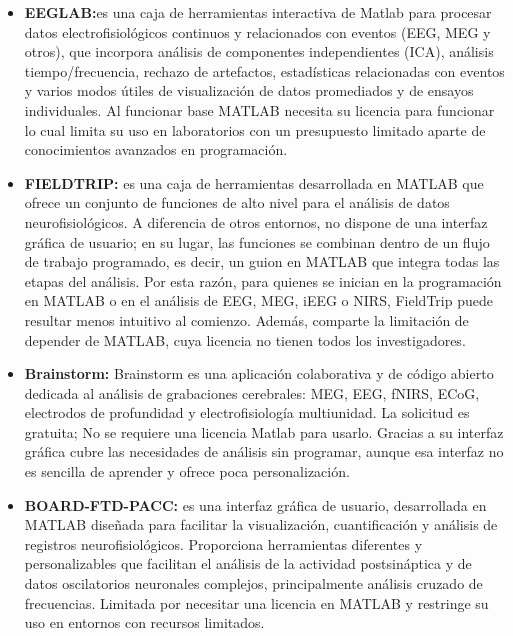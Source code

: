 \documentclass[12pt,letterpaper]{article}
\begin{document}
\begin{itemize}
    \item \textbf{EEGLAB:}es una caja de herramientas interactiva de Matlab para procesar datos electrofisiológicos continuos y relacionados con eventos (EEG, MEG y otros), que incorpora análisis de componentes independientes (ICA), análisis tiempo/frecuencia, rechazo de artefactos, estadísticas relacionadas con eventos y varios modos útiles de visualización de datos promediados y de ensayos individuales.\cite{noauthor_eeglab_nodate} Al funcionar base MATLAB necesita su licencia para funcionar lo cual limita su uso en laboratorios con un presupuesto limitado aparte de conocimientos avanzados en programación.
    \item \textbf{FIELDTRIP: } es una caja de herramientas desarrollada en MATLAB que ofrece un conjunto de funciones de alto nivel para el análisis de datos neurofisiológicos. A diferencia de otros entornos, no dispone de una interfaz gráfica de usuario; en su lugar, las funciones se combinan dentro de un flujo de trabajo programado, es decir, un guion en MATLAB que integra todas las etapas del análisis.\cite{noauthor_getting_nodate} Por esta razón, para quienes se inician en la programación en MATLAB o en el análisis de EEG, MEG, iEEG o NIRS, FieldTrip puede resultar menos intuitivo al comienzo. Además, comparte la limitación de depender de MATLAB, cuya licencia no tienen todos los investigadores.
    
    \item \textbf{Brainstorm: }Brainstorm es una aplicación colaborativa y de código abierto dedicada al análisis de grabaciones cerebrales:
MEG, EEG, fNIRS, ECoG, electrodos de profundidad y electrofisiología multiunidad. La solicitud es gratuita; No se requiere una licencia Matlab para usarlo. \cite{noauthor_introduccion_nodate} Gracias a su interfaz gráfica cubre las necesidades de análisis sin programar, aunque esa interfaz no es sencilla de aprender y ofrece poca personalización.

\item \textbf{BOARD-FTD-PACC:}  es una interfaz gráfica de usuario, desarrollada en MATLAB diseñada para facilitar la visualización, cuantificación y análisis de registros neurofisiológicos. Proporciona herramientas diferentes y personalizables que facilitan el análisis de la actividad postsináptica y de datos oscilatorios neuronales complejos, principalmente análisis cruzado de frecuencias.\cite{gauthier-umana_board-ftd-pacc_2023} Limitada por necesitar una licencia en MATLAB y restringe su uso en entornos con recursos limitados.   
\end{itemize}
\end{document}
